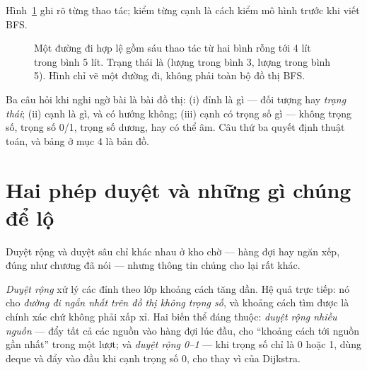 \documentclass[../../algorithm.tex]{subfiles}
\begin{document}
Hình~\ref{fig:state-graph} ghi rõ từng thao tác; kiểm từng cạnh là cách kiểm mô hình trước khi viết BFS.
\begin{figure}[H]\centering
{}
\caption{Một đường đi hợp lệ gồm sáu thao tác từ hai bình rỗng tới 4 lít trong bình 5 lít. Trạng thái là (lượng trong bình 3, lượng trong bình 5). Hình chỉ vẽ một đường đi, không phải toàn bộ đồ thị BFS.}
\label{fig:state-graph}
\end{figure}

\begin{cannho}
Ba câu hỏi khi nghi ngờ bài là bài đồ thị: (i) đỉnh là gì --- đối tượng hay \emph{trạng thái}; (ii) cạnh là gì, và có hướng không; (iii) cạnh có trọng số gì --- không trọng số, trọng số 0/1, trọng số dương, hay có thể âm. Câu thứ ba quyết định thuật toán, và bảng ở mục 4 là bản đồ.
\end{cannho}

\section{Hai phép duyệt và những gì chúng để lộ}

Duyệt rộng và duyệt sâu chỉ khác nhau ở kho chờ --- hàng đợi hay ngăn xếp, đúng như chương  đã nói --- nhưng thông tin chúng cho lại rất khác.

\emph{Duyệt rộng} xử lý các đỉnh theo lớp khoảng cách tăng dần. Hệ quả trực tiếp: nó cho \emph{đường đi ngắn nhất trên đồ thị không trọng số}, và khoảng cách tìm được là chính xác chứ không phải xấp xỉ. Hai biến thể đáng thuộc: \emph{duyệt rộng nhiều nguồn} --- đẩy tất cả các nguồn vào hàng đợi lúc đầu, cho ``khoảng cách tới nguồn gần nhất'' trong một lượt; và \emph{duyệt rộng 0--1} --- khi trọng số chỉ là 0 hoặc 1, dùng deque và đẩy vào đầu khi cạnh trọng số 0, cho  thay vì  của Dijkstra.
\end{document}
